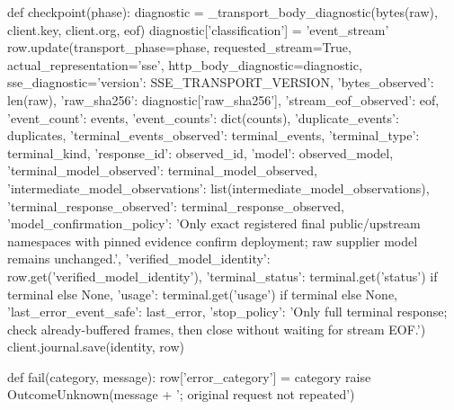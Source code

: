 {    def checkpoint(phase):
        diagnostic = _transport_body_diagnostic(bytes(raw), client.key, client.org, eof)
        diagnostic['classification'] = 'event_stream'
        row.update(transport_phase=phase, requested_stream=True, actual_representation='sse',
                   http_body_diagnostic=diagnostic,
                   sse_diagnostic={'version': SSE_TRANSPORT_VERSION,
                     'bytes_observed': len(raw), 'raw_sha256': diagnostic['raw_sha256'],
                     'stream_eof_observed': eof, 'event_count': events, 'event_counts': dict(counts),
                     'duplicate_events': duplicates, 'terminal_events_observed': terminal_events,
                     'terminal_type': terminal_kind, 'response_id': observed_id, 'model': observed_model,
                     'terminal_model_observed': terminal_model_observed,
                     'intermediate_model_observations': list(intermediate_model_observations),
                     'terminal_response_observed': terminal_response_observed,
                     'model_confirmation_policy': 'Only exact registered final public/upstream namespaces with pinned evidence confirm deployment; raw supplier model remains unchanged.',
                     'verified_model_identity': row.get('verified_model_identity'),
                     'terminal_status': terminal.get('status') if terminal else None,
                     'usage': terminal.get('usage') if terminal else None,
                     'last_error_event_safe': last_error,
                     'stop_policy': 'Only full terminal response; check already-buffered frames, then close without waiting for stream EOF.'})
        client.journal.save(identity, row)

    def fail(category, message):
        row['error_category'] = category
        raise OutcomeUnknown(message + '; original request not repeated')

}
